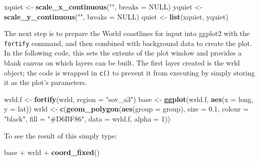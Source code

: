 \documentclass[]{article}
\newenvironment{Shaded}{}{}
\newcommand{\KeywordTok}[1]{\textcolor[rgb]{0.00,0.44,0.13}{\textbf{{#1}}}}
\newcommand{\DataTypeTok}[1]{\textcolor[rgb]{0.56,0.13,0.00}{{#1}}}
\newcommand{\DecValTok}[1]{\textcolor[rgb]{0.25,0.63,0.44}{{#1}}}
\newcommand{\FloatTok}[1]{\textcolor[rgb]{0.25,0.63,0.44}{{#1}}}
\newcommand{\StringTok}[1]{\textcolor[rgb]{0.25,0.44,0.63}{{#1}}}
\newcommand{\OtherTok}[1]{\textcolor[rgb]{0.00,0.44,0.13}{{#1}}}
\newcommand{\NormalTok}[1]{{#1}}
\begin{document}
\begin{Shaded}
\begin{Highlighting}[]
\NormalTok{xquiet <- }\KeywordTok{scale_x_continuous}\NormalTok{(}\StringTok{""}\NormalTok{, }\DataTypeTok{breaks =} \OtherTok{NULL}\NormalTok{)}
\NormalTok{yquiet <- }\KeywordTok{scale_y_continuous}\NormalTok{(}\StringTok{""}\NormalTok{, }\DataTypeTok{breaks =} \OtherTok{NULL}\NormalTok{)}
\NormalTok{quiet <- }\KeywordTok{list}\NormalTok{(xquiet, yquiet)}
\end{Highlighting}
\end{Shaded}

The next step is to prepare the World coastlines for input into ggplot2 with the \texttt{fortify}  command, and then combined with background data to create the plot. In the following code, this sets the extents of the plot window and provides a
blank canvas on which layers can be built. The first layer
created is the wrld object; the code is wrapped in \texttt{c()} to
prevent it from executing by simply storing it as the plot's parameters.

\begin{Shaded}
\begin{Highlighting}[]
\NormalTok{wrld.f <- }\KeywordTok{fortify}\NormalTok{(wrld, }\DataTypeTok{region =} \StringTok{"sov_a3"}\NormalTok{)}
\NormalTok{base <- }\KeywordTok{ggplot}\NormalTok{(wrld.f, }\KeywordTok{aes}\NormalTok{(}\DataTypeTok{x =} \NormalTok{long, }\DataTypeTok{y =} \NormalTok{lat))}
\NormalTok{wrld <- }\KeywordTok{c}\NormalTok{(}\KeywordTok{geom_polygon}\NormalTok{(}\KeywordTok{aes}\NormalTok{(}\DataTypeTok{group =} \NormalTok{group), }\DataTypeTok{size =} \FloatTok{0.1}\NormalTok{, }\DataTypeTok{colour =} \StringTok{"black"}\NormalTok{, }\DataTypeTok{fill =} \StringTok{"#D6BF86"}\NormalTok{, }
    \DataTypeTok{data =} \NormalTok{wrld.f, }\DataTypeTok{alpha =} \DecValTok{1}\NormalTok{))}
\end{Highlighting}
\end{Shaded}

To see the result of this simply type:

\begin{Shaded}
\begin{Highlighting}[]
\NormalTok{base + wrld + }\KeywordTok{coord_fixed}\NormalTok{()}
\end{Highlighting}
\end{Shaded}
\end{document}
